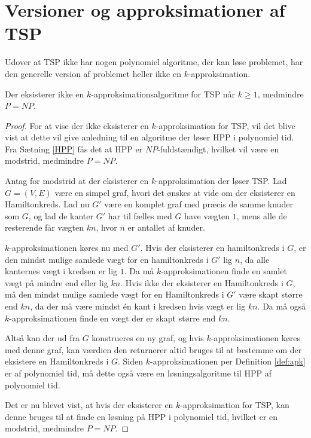 \section{Versioner og approksimationer af TSP}
Udover at TSP ikke har nogen polynomiel algoritme, der kan løse problemet, har den generelle version af problemet heller ikke en $k$-approksimation.

\begin{thm}
	Der eksisterer ikke en $k$-approksimationsalgoritme for TSP når $k \geq 1$, medmindre $P = NP$.
\end{thm}
\begin{proof}
	For at vise der ikke eksisterer en $k$-approksimation for TSP, vil det blive vist at dette vil give anledning til en algoritme der løser HPP i polynomiel tid.
	Fra Sætning \ref{HPP} fås det at HPP er $NP$-fuldstændigt, hvilket vil være en modstrid, medmindre $P=NP$.

	Antag for modstrid at der eksisterer en $k$-approksimation der løser TSP.
	Lad $G=(V,E)$ være en simpel graf, hvori det ønskes at vide om der eksisterer en Hamiltonkreds.
	Lad nu $G'$ være en komplet graf med præcis de samme knuder som $G$, og lad de kanter $G'$ har til fælles med $G$ have vægten $1$, mens alle de resterende får vægten $kn$, hvor $n$ er antallet af knuder.

	$k$-approksimationen køres nu med $G'$.
	Hvis der eksisterer en hamiltonkreds i $G$, er den mindst mulige samlede vægt for en hamiltonkreds i $G'$ lig $n$, da alle kanternes vægt i kredsen er lig $1$.
	Da må $k$-approksimationen finde en samlet vægt på mindre end eller lig $kn$.
	Hvis ikke der eksisterer en Hamiltonkreds i $G$, må den mindst mulige samlede vægt for en Hamiltonkreds i $G'$ være skapt større end $kn$, da der må være mindst én kant i kredsen hvis vægt er lig $kn$.
	Da må også $k$-approksimationen finde en vægt der er skapt større end $kn$.

	Altså kan der ud fra $G$ konstrueres en ny graf, og hvis $k$-approksimationen køres med denne graf, kan værdien den returnerer altid bruges til at bestemme om der eksistere en Hamiltonkreds i $G$.
	Siden $k$-approksimationen per Definition \ref{def:apk} er af polynomiel tid, må dette også være en løsningsalgoritme til HPP af polynomiel tid.

	Det er nu blevet vist, at hvis der eksisterer en $k$-approksimation for TSP, kan denne bruges til at finde en løsning på HPP i polynomiel tid, hvilket er en modstrid, medmindre $P=NP$.
\end{proof}

